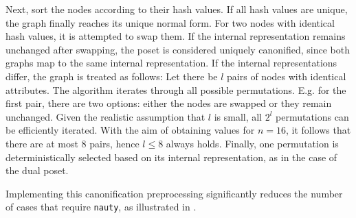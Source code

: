 \documentclass[twoside,leqno,twocolumn]{article}
\begin{document}
Next, sort the nodes according to their hash values. %
If all hash values are unique, the graph finally reaches its unique normal form. %
For two nodes with identical hash values, it is attempted to swap them.
If the internal representation remains unchanged after swapping, the poset is considered uniquely canonified, since both graphs map to the same internal representation.
If the internal representations differ, the graph is treated as follows:
Let there be $l$ pairs of nodes with identical attributes.
The algorithm iterates through all possible permutations.
E.g. for the first pair, there are two options: either the nodes are swapped or they remain unchanged. %
Given the realistic assumption that $l$ is small, all $2^l$ permutations can be efficiently iterated.
With the aim of obtaining values for $n = 16$, it follows that there are at most $8$ pairs, hence $l \leq 8$ always holds.
Finally, one permutation is deterministically selected based on its internal representation, as in the case of the dual poset.

Implementing this canonification preprocessing significantly reduces the number of cases that require \texttt{nauty}, as illustrated in .

\begin{table}[!t]
  \renewcommand{\arraystretch}{1.2}
  \caption{Percentage of canonification requiring \texttt{nauty} for variable $n$ and $i$, where lower values are preferable.}
  \label{table:nauty-ratio}
  \centering
\end{table}
\end{document}
